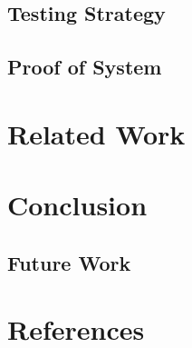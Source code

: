 \documentclass{article}
\begin{document}
\subsection{Testing Strategy}
\subsection{Proof of System}

\section{Related Work}

\section{Conclusion}
\subsection{Future Work}

\section{References}
\end{document}
